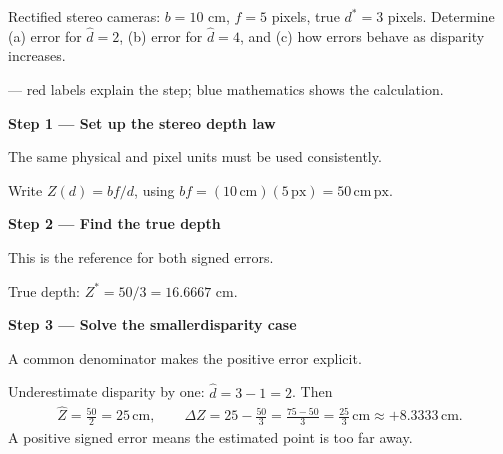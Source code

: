 \documentclass[letterpaper,11pt,english,openany,oneside]{jupyterBook}
\begin{document}
\sphinxAtStartPar
Rectified stereo cameras: \(b=10\) cm, \(f=5\) pixels, true \(d^*=3\) pixels. Determine (a) error for \(\hat d=2\), (b) error for \(\hat d=4\), and (c) how errors behave as disparity increases.

\par\medskip

\sphinxAtStartPar
{} — red labels explain the step; blue mathematics shows the calculation.

\par\medskip{}
{\color{QuizStepRed}\bfseries Step 1 — Set up the stereo depth law}\par\smallskip

\sphinxAtStartPar
{} The same physical and pixel units must be used consistently.

\sphinxAtStartPar
Write {\color{QuizMathBlue} \(Z(d)=bf/d\)}, using {\color{QuizMathBlue} \(bf=(10\,\mathrm{cm})(5\,\mathrm{px})=50\,\mathrm{cm\,px}\)}.

\par

\par\medskip{}
{\color{QuizStepRed}\bfseries Step 2 — Find the true depth}\par\smallskip

\sphinxAtStartPar
{} This is the reference for both signed errors.

\sphinxAtStartPar
True depth: {\color{QuizMathBlue} \(Z^*=50/3=16.6667\)} cm.

\par

\par\medskip{}
{\color{QuizStepRed}\bfseries Step 3 — Solve the smaller\sphinxhyphen{}disparity case}\par\smallskip

\sphinxAtStartPar
{} A common denominator makes the positive error explicit.

\sphinxAtStartPar
Underestimate disparity by one: {\color{QuizMathBlue} \(\widehat d=3-1=2\)}. Then
{\color{QuizMathBlue} \begin{equation*}
\begin{split}
\widehat Z=\frac{50}{2}=25\,\mathrm{cm},\qquad
\Delta Z=25-\frac{50}{3}=\frac{75-50}{3}=\frac{25}{3}\,\mathrm{cm}\approx+8.3333\,\mathrm{cm}.
\end{split}
\end{equation*}}
\sphinxAtStartPar
A positive signed error means the estimated point is too far away.
\end{document}
